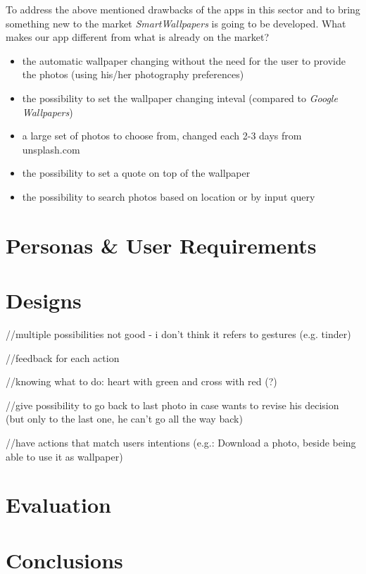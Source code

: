 \documentclass[]{article}
\begin{document}
		\indent
		To address the above mentioned drawbacks of the apps in this sector and to bring something new to the market \textit{SmartWallpapers} is going to be developed.
		What makes our app different from what is already on the market?

		\begin{itemize}
			\item the automatic wallpaper changing without the need for the user to provide the photos (using his/her photography preferences)

			\item the possibility to set the wallpaper changing inteval (compared to \textit{Google Wallpapers})
			
			\item a large set of photos to choose from, changed each 2-3 days from unsplash.com

			\item the possibility to set a quote on top of the wallpaper

			\item the possibility to search photos based on location or by input query

		\end{itemize}

\section{Personas \& User Requirements}

\section{Designs}
//multiple possibilities not good - i don't think it refers to gestures (e.g. tinder)

//feedback for each action

//knowing what to do: heart with green and cross with red (?)

//give possibility to go back to last photo in case wants to revise his decision (but only to the last one, he can't go all the way back)

//have actions that match users intentions (e.g.: Download a photo, beside being able to use it as wallpaper)
\section{Evaluation}

\section{Conclusions}
\end{document}
